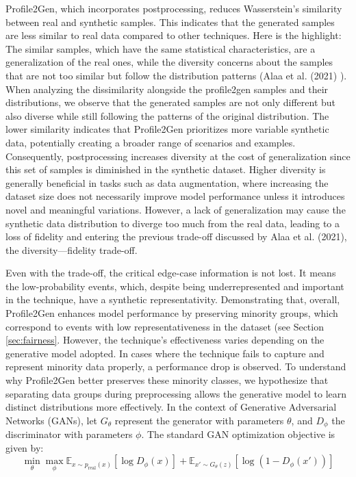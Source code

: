 \documentclass{article}
\theoremstyle{plain}
\theoremstyle{definition}
\theoremstyle{remark}
\begin{document}
Profile2Gen, which incorporates postprocessing, reduces Wasserstein's similarity between real and synthetic samples. This indicates that the generated samples are less similar to real data compared to other techniques. Here is the highlight: The similar samples, which have the same statistical characteristics, are a generalization of the real ones, while the diversity concerns about the samples that are not too similar but follow the distribution patterns (Alaa et al. (2021) \cite{evaluate}).  When analyzing the dissimilarity alongside the profile2gen samples and their distributions, we observe that the generated samples are not only different but also diverse while still following the patterns of the original distribution. The lower similarity indicates that Profile2Gen prioritizes more variable synthetic data, potentially creating a broader range of scenarios and examples. 
Consequently, postprocessing increases diversity at the cost of generalization since this set of samples is diminished in the synthetic dataset. Higher diversity is generally beneficial in tasks such as data augmentation, where increasing the dataset size does not necessarily improve model performance unless it introduces novel and meaningful variations.
However, a lack of generalization may cause the synthetic data distribution to diverge too much from the real data, leading to a loss of fidelity and entering the previous trade-off discussed by Alaa et al. (2021), the diversity—fidelity trade-off. 

Even with the trade-off, the critical edge-case information is not lost. It means the low-probability events, which, despite being underrepresented and important in the technique, have a synthetic representativity. Demonstrating that, overall, Profile2Gen enhances model performance by preserving minority groups, which correspond to events with low representativeness in the dataset (see Section \ref{sec:fairness}. However, the technique's effectiveness varies depending on the generative model adopted. In cases where the technique fails to capture and represent minority data properly, a performance drop is observed.
To understand why Profile2Gen better preserves these minority classes, we hypothesize that separating data groups during preprocessing allows the generative model to learn distinct distributions more effectively. In the context of Generative Adversarial Networks (GANs), let \( G_{\theta} \) represent the generator with parameters \( \theta \), and \( D_{\phi} \) the discriminator with parameters \( \phi \). The standard GAN optimization objective is given by:
\[
\min_{\theta} \max_{\phi} \mathbb{E}_{x \sim p_{\text{real}}(x)} \left[ \log D_{\phi}(x) \right] + \mathbb{E}_{x' \sim G_{\theta}(z)} \left[ \log (1 - D_{\phi}(x')) \right]
\]
\end{document}
